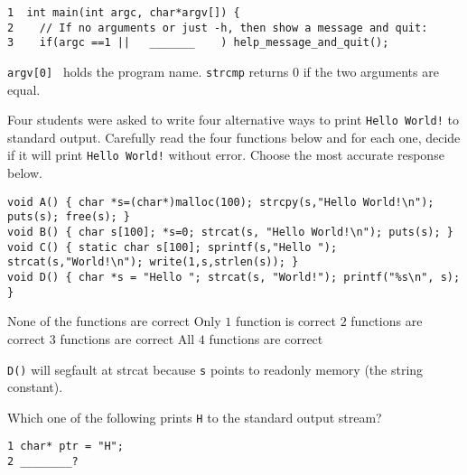 \begin{verbatim}
1  int main(int argc, char*argv[]) {
2    // If no arguments or just -h, then show a message and quit:
3    if(argc ==1 ||   _______    ) help_message_and_quit();
\end{verbatim}
\begin{answers}
\end{answers}
\begin{solution}
{\tt argv[0] } holds the program name.
{\tt strcmp} returns 0 if the two arguments are equal.
\end{solution}




\variant
Four students were asked to write four alternative ways to print {\tt Hello World!} to standard output. 
Carefully read the four functions below and for each one, decide if it will print {\tt Hello World!} without error.
Choose the most accurate response below.
\begin{verbatim}
void A() { char *s=(char*)malloc(100); strcpy(s,"Hello World!\n"); puts(s); free(s); }
void B() { char s[100]; *s=0; strcat(s, "Hello World!\n"); puts(s); }
void C() { static char s[100]; sprintf(s,"Hello "); strcat(s,"World!\n"); write(1,s,strlen(s)); }
void D() { char *s = "Hello "; strcat(s, "World!"); printf("%s\n", s); }
\end{verbatim}
\begin{answers}
\answer None of the functions are correct
\answer Only $1$ function is correct
\answer $2$ functions are correct
\correctanswer $3$ functions are correct
\answer All $4$ functions are correct
\end{answers}
\begin{solution}
{\tt D()} will segfault at strcat because {\tt s} points to readonly memory (the string constant).
\end{solution}




\variant
Which one of the following prints {\tt H} to the standard output stream?
\begin{verbatim}
1 char* ptr = "H";
2 ________?
\end{verbatim}
\begin{answers}
\end{answers}
\begin{solution}
\end{solution}


